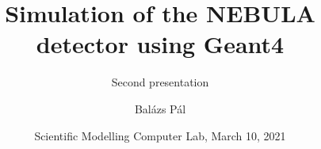 \title[Geant4]
{Simulation of the NEBULA detector using Geant4}

\subtitle{Second presentation}

\author[Balázs Pál]
{Balázs Pál}


\date[ELTE 2021]
{Scientific Modelling Computer Lab, March 10, 2021}

